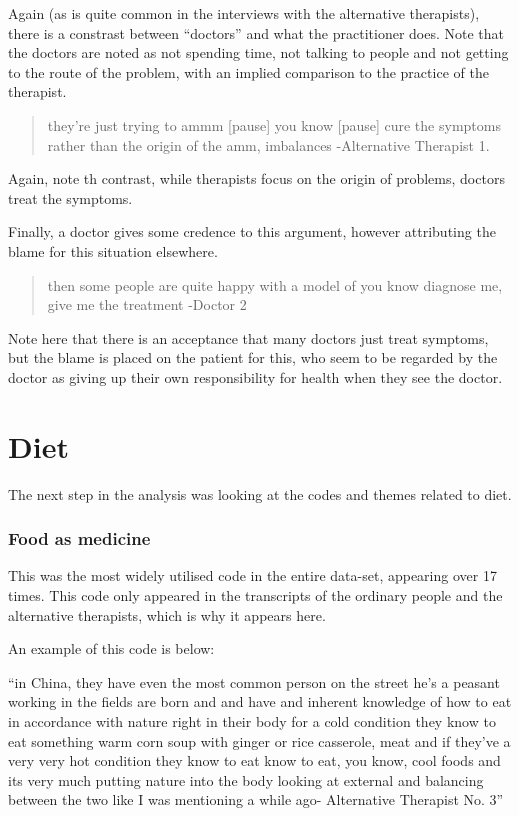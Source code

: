 Again (as is quite common in the interviews with the alternative therapists), there is a constrast between ``doctors'' and what the practitioner does. Note that the doctors are noted as not spending time, not talking to people and not getting to the route of the problem, with an implied comparison to the practice of the therapist. 


\begin{quotation}
  they're just trying to ammm [pause] you know [pause] cure the symptoms rather than the origin of the amm, imbalances
-Alternative Therapist 1. 
\end{quotation}

Again, note th contrast, while therapists focus on the origin of problems, doctors treat the symptoms. 

Finally, a doctor gives some credence to this argument, however attributing the blame for this situation elsewhere. 

\begin{quotation}
  then some people are quite happy with a model of you know diagnose me, give me the treatment
-Doctor 2
\end{quotation}

Note here that there is an acceptance that many doctors just treat symptoms, but the blame is placed on the patient for this, who seem to be regarded by the doctor as giving up their own responsibility for health when they see the doctor. 

\section{Diet}
\label{sec:diet}

The next step in the analysis was looking at the codes and themes related to diet. 

\subsubsection{Food as medicine}

This was the most widely utilised code in the entire data-set, appearing over 17 times. This code only appeared in the transcripts of the ordinary people and the alternative therapists, which is why it appears here. 

An example of this code is below:

``in China, they have even the most common person on the street he's a peasant working in the fields are born and and have and inherent knowledge of how to eat in accordance with nature right in their body for a cold condition they know to eat something warm corn soup with ginger or rice casserole, meat and if they've a very very hot condition they know to eat know to eat, you know, cool foods and its very much putting nature into the body looking at external and balancing between the two like I was mentioning a while ago- Alternative Therapist No. 3''

